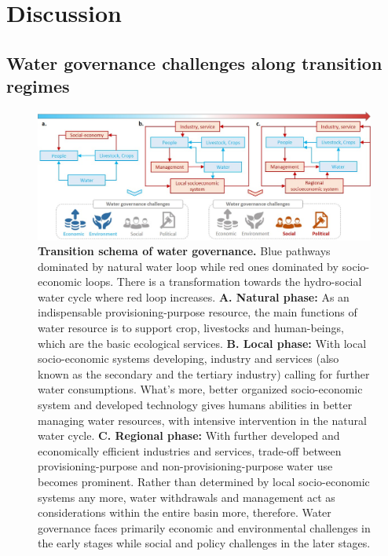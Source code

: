 \documentclass[9pt, twocolumn, twoside, lineno]{pnas-new}
\begin{document}
\section*{Discussion}
\label{Discussion}

\subsection*{Water governance challenges along transition regimes}

\begin{figure}[htbp!]
	\centering
	\includegraphics[width=\linewidth]{../../figures/main/transition.jpg}
	\caption{
		\textbf{Transition schema of water governance.} Blue pathways dominated by natural water loop while red ones dominated by socio-economic loops. There is a transformation towards the hydro-social water cycle where red loop increases.
		\textbf{A. Natural phase:} As an indispensable provisioning-purpose resource, the main functions of water resource is to support crop, livestocks and human-beings, which are the basic ecological services.
		\textbf{B. Local phase:} With local socio-economic systems developing, industry and services (also known as the secondary and the tertiary industry) calling for further water consumptions. What's more, better organized socio-economic system and developed technology gives humans abilities in better managing water resources, with intensive intervention in the natural water cycle. 
		\textbf{C. Regional phase:} With further developed and economically efficient industries and services, trade-off between provisioning-purpose and non-provisioning-purpose water use becomes prominent. Rather than determined by local socio-economic systems any more, water withdrawals and management act as considerations within the entire basin more, therefore. 
		Water governance faces primarily economic and environmental challenges in the early stages while social and policy challenges in the later stages.
	}
	\label{fig:summary}
\end{figure}
\end{document}
